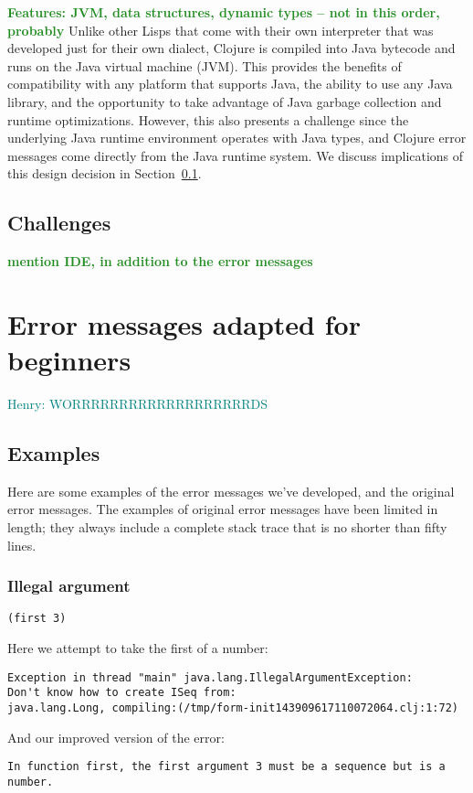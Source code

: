 \documentclass[submission,copyright,creativecommons]{eptcs}
\newcommand{\allcomments}[1]{{#1}}
\newcommand{\emcomment}[1]{{\bf \textcolor{ForestGreen}{\allcomments{{#1}}}}}
\newcommand{\hfcomment}[1]{\textcolor{Teal}{\allcomments{Henry: {#1}}}}
\begin{document}
\emcomment{Features: JVM, data structures, dynamic types -- not in this order, probably}
Unlike other Lisps that come with their own interpreter that was developed just for their own dialect, Clojure is compiled 
into Java bytecode and runs on the Java virtual machine (JVM). This provides the benefits of compatibility with 
any platform that supports Java, the ability to use any Java library, and the opportunity to take advantage of Java 
garbage collection and runtime optimizations. However, this also presents a challenge since the underlying Java 
runtime environment operates with Java types, and Clojure error messages come directly from the Java runtime
system. We discuss implications of this design decision in Section~\ref{subsec:challenges}.

\subsection{Challenges}\label{subsec:challenges}

\emcomment{mention IDE, in addition to the error messages}

\section{Error messages adapted for beginners}\label{sec:errors-work}
\hfcomment{WORRRRRRRRRRRRRRRRRRRDS}

\subsection{Examples}
Here are some examples of the error messages we've developed, and the original error messages. The examples of original error messages have been limited in length; they always include a complete stack trace that is no shorter than fifty lines.

\subsubsection{Illegal argument}
{\tt (first 3)}

Here we attempt to take the first of a number:
\begin{verbatim}
Exception in thread "main" java.lang.IllegalArgumentException:
Don't know how to create ISeq from:
java.lang.Long, compiling:(/tmp/form-init143909617110072064.clj:1:72)
\end{verbatim}


And our improved version of the error:
\begin{verbatim}
In function first, the first argument 3 must be a sequence but is a number.
\end{verbatim}
\end{document}
